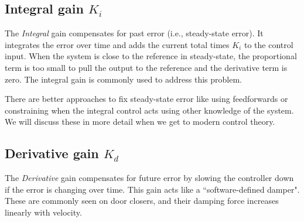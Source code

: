 \subsection{Integral gain $K_i$}

The \textit{Integral} gain compensates for past \gls{error} (i.e.,
\gls{steady-state error}). It integrates the \gls{error} over time and adds the
current total times $K_i$ to the \gls{control input}. When the \gls{system} is
close to the \gls{reference} in steady-state, the proportional term is too small
to pull the \gls{output} to the \gls{reference} and the derivative term is zero.
The integral gain is commonly used to address this problem.

There are better approaches to fix \gls{steady-state error} like using
feedforwards or constraining when the integral control acts using other
knowledge of the \gls{system}. We will discuss these in more detail when we get
to modern control theory.

\subsection{Derivative gain $K_d$}

The \textit{Derivative} gain compensates for future \gls{error} by slowing the
controller down if the \gls{error} is changing over time. This gain acts like a
``software-defined damper". These are commonly seen on door closers, and their
damping force increases linearly with velocity.
